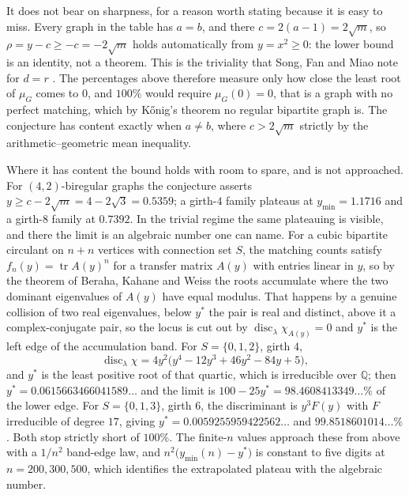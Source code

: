 \documentclass[11pt]{article}
\theoremstyle{remark}
\begin{document}
It does not bear on sharpness, for a reason worth stating because it is easy to
miss. Every graph in the table has $a=b$, and there $c=2(a-1)=2\sqrt m$, so
$\rho=y-c\ge-c=-2\sqrt m$ holds automatically from $y=x^2\ge0$: the lower bound is
an identity, not a theorem. This is the triviality that Song, Fan and Miao note
for $d=r$ \cite{SFM}. The percentages above therefore measure only how close the
least root of $\mu_G$ comes to $0$, and $100\%$ would require $\mu_G(0)=0$, that
is a graph with no perfect matching, which by K\H onig's theorem no regular
bipartite graph is. The conjecture has content exactly when $a\ne b$, where
$c>2\sqrt m$ strictly by the arithmetic--geometric mean inequality.

Where it has content the bound holds with room to spare, and is not approached.
For $(4,2)$-biregular graphs the conjecture asserts $y\ge c-2\sqrt m=4-2\sqrt3
=0.5359$; a girth-$4$ family plateaus at $y_{\min}=1.1716$ and a girth-$8$ family
at $0.7392$. In the trivial regime the same plateauing is visible, and there
the limit is an algebraic number one can name. For a cubic bipartite circulant on
$n+n$ vertices with connection set $S$, the matching counts satisfy
$f_n(y)=\operatorname{tr}A(y)^n$ for a transfer matrix $A(y)$ with entries linear
in $y$, so by the theorem of Beraha, Kahane and Weiss the roots accumulate where
the two dominant eigenvalues of $A(y)$ have equal modulus. That happens by a
genuine collision of two real eigenvalues, below $y^*$ the pair is real and
distinct, above it a complex-conjugate pair, so the locus is cut out by
$\operatorname{disc}_\lambda\chi_{A(y)}=0$ and $y^*$ is the left edge of the
accumulation band. For $S=\{0,1,2\}$, girth $4$,
\[
\operatorname{disc}_\lambda\chi=4y^2\bigl(y^4-12y^3+46y^2-84y+5\bigr),
\]
and $y^*$ is the least positive root of that quartic, which is irreducible over
$\mathbb Q$; then $y^*=0.0615663466041589\ldots$ and the limit is
$100-25y^*=98.4608413349\ldots\%$ of the lower edge. For $S=\{0,1,3\}$, girth
$6$, the discriminant is $y^3F(y)$ with $F$ irreducible of degree $17$, giving
$y^*=0.0059255959422562\ldots$ and $99.8518601014\ldots\%$. Both stop strictly
short of $100\%$. The finite-$n$ values approach these from above with a $1/n^2$
band-edge law, and $n^2\bigl(y_{\min}(n)-y^*\bigr)$ is constant to five digits at
$n=200,300,500$, which identifies the extrapolated plateau with the algebraic
number.
\end{document}
